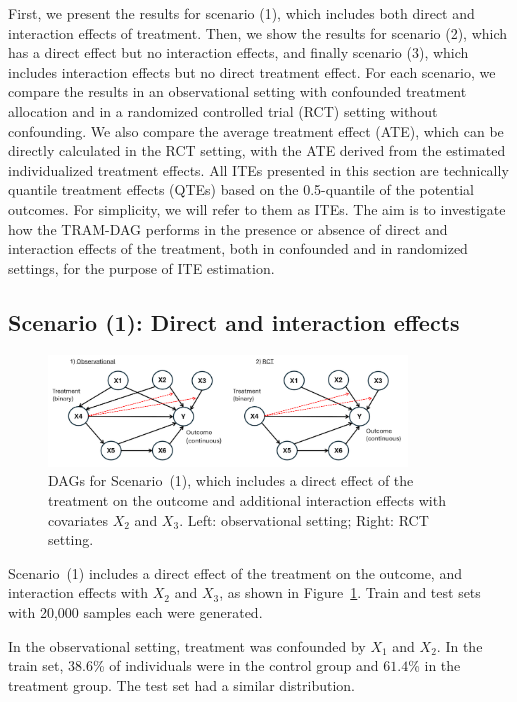 First, we present the results for scenario (1), which includes both direct and interaction effects  of treatment. Then, we show the results for scenario (2), which has a direct effect but no interaction effects, and finally scenario (3), which includes interaction effects but no direct treatment effect. For each scenario, we compare the results in an observational setting with confounded treatment allocation and in a randomized controlled trial (RCT) setting without confounding. We also compare the average treatment effect (ATE), which can be directly calculated in the RCT setting, with the ATE derived from the estimated individualized treatment effects. All ITEs presented in this section are technically quantile treatment effects (QTEs) based on the 0.5-quantile of the potential outcomes. For simplicity, we will refer to them as ITEs. The aim is to investigate how the TRAM-DAG performs in the presence or absence of direct and interaction effects of the treatment, both in confounded and in randomized settings, for the purpose of ITE estimation.

\subsection{Scenario (1): Direct and interaction effects} 


\begin{figure}[H]
\centering
\includegraphics[width=0.85\textwidth]{img/exp4_dags.png}
\caption{DAGs for Scenario~(1), which includes a direct effect of the treatment on the outcome and additional interaction effects with covariates $X_2$ and $X_3$. Left: observational setting; Right: RCT setting.}
\label{fig:ite_dag_observational_1}
\end{figure}

Scenario~(1) includes a direct effect of the treatment on the outcome, and interaction effects with $X_2$ and $X_3$, as shown in Figure~\ref{fig:ite_dag_observational_1}. Train and test sets with 20,000 samples each were generated.

In the observational setting, treatment was confounded by $X_1$ and $X_2$. In the train set, $38.6$\% of individuals were in the control group and $61.4$\% in the treatment group. The test set had a similar distribution.

